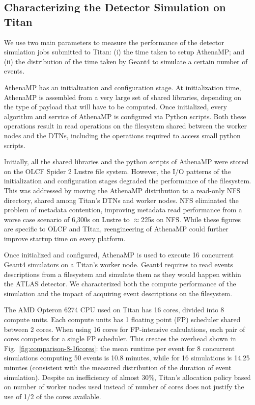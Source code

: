 \subsection{Characterizing the Detector Simulation on
Titan}\label{ssec:athenamp_titan}

We use two main parameters to measure the performance of the detector
simulation jobs submitted to Titan: (i) the time taken to setup AthenaMP\@;
and (ii) the distribution of the time taken by Geant4 to simulate a certain
number of events.

AthenaMP has an initialization and configuration stage. At initialization
time, AthenaMP is assembled from a very large set of shared libraries,
depending on the type of payload that will have to be computed. Once
initialized, every algorithm and service of AthenaMP is configured via Python
scripts. Both these operations result in read operations on the filesystem
shared between the worker nodes and the DTNs, including the operations
required to access small python scripts.

Initially, all the shared libraries and the python scripts of AthenaMP were
stored on the OLCF Spider 2 Lustre file system. However, the I/O patterns of
the initialization and configuration stages degraded the performance of the
filesystem. This was addressed by moving the AthenaMP distribution to a
read-only NFS directory, shared among Titan's DTNs and worker nodes. NFS
eliminated the problem of metadata contention, improving metadata read
performance from a worse case scenario of 6,300s on Lustre to \(\approx\)225s
on NFS\@. While these figures are specific to OLCF and TItan, reengineering
of AthenaMP could further improve startup time on every platform.

Once initialized and configured, AthenaMP is used to execute 16 concurrent
Geant4 simulators on a Titan's worker node. Geant4 requires to read events
descriptions from a filesystem and simulate them as they would happen within
the ATLAS detector. We characterized both the compute performance of the
simulation and the impact of acquiring event descriptions on the filesystem.

The AMD Opteron 6274 CPU used on Titan has 16 cores, divided into 8 compute
units. Each compute units has 1 floating point (FP) scheduler shared between
2 cores. When using 16 cores for FP-intensive calculations, each pair of
cores competes for a single FP scheduler. This creates the overhead shown in
Fig.~\ref{fig:comparison-8-16cores}: the mean runtime per event for 8
concurrent simulations computing 50 events is 10.8 minutes, while for 16
simulations is 14.25 minutes (consistent with the measured distribution of
the duration of event simulation). Despite an inefficiency of almost 30\%,
Titan's allocation policy based on number of worker nodes used instead of
number of cores does not justify the use of 1/2 of the cores available.

